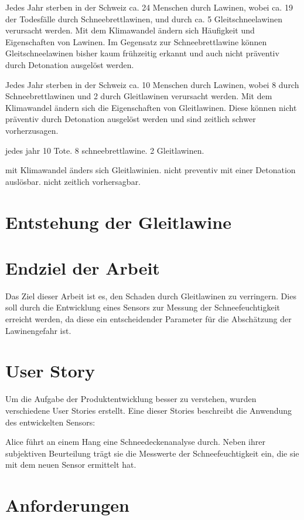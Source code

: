 Jedes Jahr sterben in der Schweiz ca. 24 Menschen durch Lawinen, wobei ca. 19 der Todesfälle durch Schneebrettlawinen, und durch ca. 5 Gleitschneelawinen verursacht werden. Mit dem Klimawandel ändern sich Häufigkeit und Eigenschaften von Lawinen. Im Gegensatz zur Schneebrettlawine können Gleitschneelawinen bisher kaum frühzeitig erkannt und auch nicht präventiv durch Detonation ausgelöst werden.


\iffalse
Jedes Jahr sterben in der Schweiz ca. 10 Menschen durch Lawinen, wobei 8 durch Schneebrettlawinen und 2 durch Gleitlawinen verursacht werden. Mit dem Klimawandel ändern sich die Eigenschaften von Gleitlawinen. Diese können nicht präventiv durch Detonation ausgelöst werden und sind zeitlich schwer vorherzusagen.


jedes jahr 10 Tote. 8 schneebrettlawine. 2 Gleitlawinen.

mit Klimawandel änders sich Gleitlawinien. nicht preventiv mit einer Detonation auslösbar. nicht zeitlich vorhersagbar.


\section{Entstehung der Gleitlawine}



\section{Endziel der Arbeit}

Das Ziel dieser Arbeit ist es, den Schaden durch Gleitlawinen zu verringern. Dies soll durch die Entwicklung eines Sensors zur Messung der Schneefeuchtigkeit erreicht werden, da diese ein entscheidender Parameter für die Abschätzung der Lawinengefahr ist.

\section{User Story}

Um die Aufgabe der Produktentwicklung besser zu verstehen, wurden verschiedene User Stories erstellt. Eine dieser Stories beschreibt die Anwendung des entwickelten Sensors:

Alice führt an einem Hang eine Schneedeckenanalyse durch. Neben ihrer subjektiven Beurteilung trägt sie die Messwerte der Schneefeuchtigkeit ein, die sie mit dem neuen Sensor ermittelt hat.

\section{Anforderungen}

